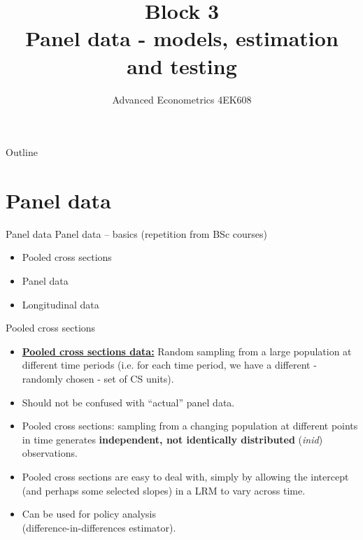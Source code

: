 \documentclass[usenames,dvipsnames]{beamer}
\title[Block 1]{Block 3 \\  Panel data - models, estimation and testing }
\author{Advanced Econometrics 4EK608}
\institute{Vysoká škola ekonomická v Praze}
\date{}
\begin{document}
 
\begin{frame}
  \titlepage
\end{frame}

\begin{frame}{Outline}
  \tableofcontents
\end{frame}
%
\section{Panel data}
\begin{frame}{Panel data}
Panel data -- basics (repetition from BSc courses) \\ \bigskip
\begin{itemize}
\item Pooled cross sections
\bigskip
\item Panel data
\bigskip
\item Longitudinal data
\end{itemize}
\end{frame}
\begin{frame}{Pooled cross sections}
\begin{itemize}
\item \underline{\textbf{Pooled cross sections data:}}
Random sampling from a large population at different time periods (i.e. for each time period, we have a different - randomly chosen - set of CS units). 
\medskip
\item Should not be confused with ``actual'' panel data. 
\medskip
\item Pooled cross sections: sampling from a changing population at different points in time generates \textbf{independent, not identically distributed} (\textit{inid}) observations. 
\medskip
\item Pooled cross sections are easy to deal with, simply by allowing the intercept (and perhaps some selected slopes) in a LRM to vary across time. 
\medskip
\item Can be used for policy analysis \\(difference-in-differences estimator). 
\end{itemize}
\end{frame}
\end{document}
